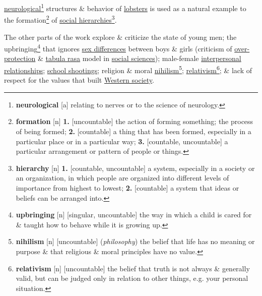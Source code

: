 \documentclass[oneside]{book}
\numberwithin{equation}{section}
\begin{document}
\href{https://en.wikipedia.org/wiki/Neurology}{neurological}\footnote{\textbf{neurological} [a] relating to nerves or to the science of neurology.} structures \& behavior of \href{https://en.wikipedia.org/wiki/Lobsters}{lobsters} is used as a natural example to the formation\footnote{\textbf{formation} [n] \textbf{1.} [uncountable] the action of forming something; the process of being formed; \textbf{2.} [countable] a thing that has been formed, especially in a particular place or in a particular way; \textbf{3.} [countable, uncountable] a particular arrangement or pattern of people or things.} of \href{https://en.wikipedia.org/wiki/Hierarchy}{social hierarchies}\footnote{\textbf{hierarchy} [n] \textbf{1.} [countable, uncountable] a system, especially in a society or an organization, in which people are organized into different levels of importance from highest to lowest; \textbf{2.} [countable] a system that ideas or beliefs can be arranged into.}.

The other parts of the work explore \& criticize the state of young men; the upbringing\footnote{\textbf{upbringing} [n] [singular, uncountable] the way in which a child is cared for \& taught how to behave while it is growing up.} that ignores \href{https://en.wikipedia.org/wiki/Sex_differences_in_humans}{sex differences} between boys \& girls (criticism of \href{https://en.wikipedia.org/wiki/Overprotective}{over-protection} \& \href{https://en.wikipedia.org/wiki/Tabula_rasa}{tabula rasa} model in \href{https://en.wikipedia.org/wiki/Social_science}{social sciences}); male-female \href{https://en.wikipedia.org/wiki/Interpersonal_relationship}{interpersonal relationships}; \href{https://en.wikipedia.org/wiki/School_shooting}{school shootings}; religion \& moral \href{https://en.wikipedia.org/wiki/Nihilism}{nihilism}\footnote{\textbf{nihilism} [n] [uncountable] (\textit{philosophy}) the belief that life has no meaning or purpose \& that religious \& moral principles have no value.}; \href{https://en.wikipedia.org/wiki/Relativism}{relativism}\footnote{\textbf{relativism} [n] [uncountable] the belief that truth is not always \& generally valid, but can be judged only in relation to other things, e.g. your personal situation.}; \& lack of respect for the values that built \href{https://en.wikipedia.org/wiki/Western_world}{Western society}.
\end{document}
